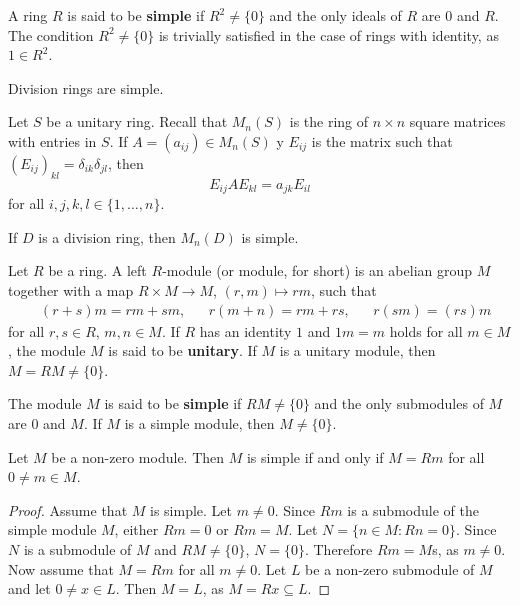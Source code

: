A ring $R$ is said to be \textbf{simple} if $R^2\ne\{0\}$ and the only ideals of 
$R$ are $0$ and $R$. The condition $R^2\ne\{0\}$ is trivially satisfied in the case of rings
with identity, as $1\in R^2$. 

\begin{example}
	Division rings are simple.
\end{example}

Let $S$ be a unitary ring. Recall that $M_n(S)$ is the ring of $n\times n$ square matrices 
with entries in $S$.  If $A=(a_{ij})\in M_n(S)$ y $E_{ij}$ is the matrix
such that $(E_{ij})_{kl}=\delta_{ik}\delta_{jl}$, then
\begin{equation}
	\label{eq:trick}
E_{ij}AE_{kl}=a_{jk}E_{il}
\end{equation}
for all $i,j,k,l\in\{1,\dots,n\}$. 

\begin{exercise}
	If $D$ is a division ring, then $M_n(D)$ is simple. 
\end{exercise}

Let $R$ be a ring. A left $R$-module (or module, for short)  
is an abelian group $M$ together with a map $R\times M\to M$, $(r,m)\mapsto rm$, such that
\begin{align*}
	&(r+s)m=rm+sm, &&
	r(m+n)=rm+rs, && r(sm)=(rs)m    
\end{align*}
for all $r,s\in R$, $m,n\in M$.  If $R$ has an identity 
$1$ and $1m=m$ holds for all $m\in M$, the module $M$ is said to be 
\textbf{unitary}.  If $M$ is a unitary module, then $M=RM\ne\{0\}$.


The module $M$ is said to be 
\textbf{simple} if $RM\ne\{0\}$ and the only submodules of $M$ are $0$ and $M$.
If $M$ is a simple module, then $M\ne\{0\}$.


\begin{lemma}
	\label{lemma:simple}
	Let $M$ be a non-zero module. Then $M$ is simple if and only if $M=Rm$
	for all $0\ne m\in M$.
\end{lemma}

\begin{proof}
	Assume that $M$ is simple.  Let $m\ne 0$. Since $Rm$ is a submodule of the simple 
	module $M$, either $Rm=0$ or $Rm=M$.  Let $N=\{n\in M:Rn=0\}$. Since $N$ is a 
	submodule of $M$ and $RM\ne\{0\}$, $N=\{0\}$. Therefore $Rm=M$s, as $m\ne0$.
	Now assume that $M=Rm$ for all $m\ne0$. Let $L$ be a non-zero submodule of 
	$M$ and let $0\ne x\in L$. Then $M=L$, as $M=Rx\subseteq L$. 
\end{proof} 

